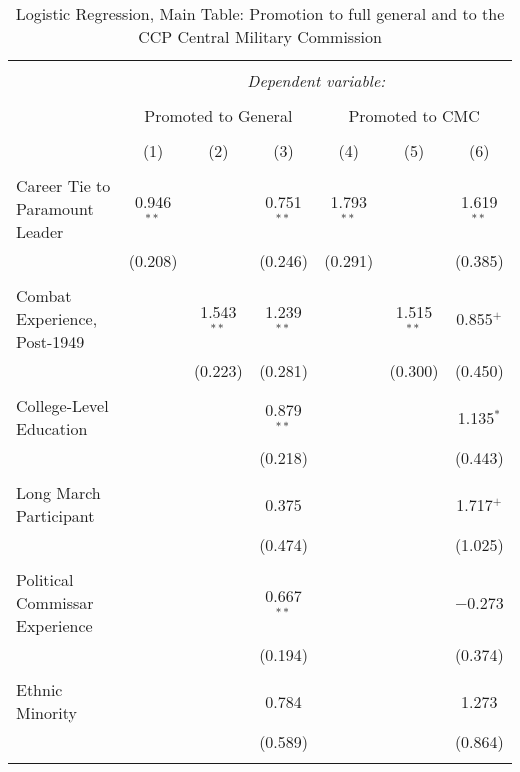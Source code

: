 \documentclass[12pt,letterpaper]{article}
\begin{document}
\begin{table}[!htbp] \centering 
	\caption{Logistic Regression, Main Table: Promotion to full general and to the CCP Central Military Commission} 
	\label{table_a8} 
	\begin{tabular}{@{\extracolsep{5pt}}lcccccc} 
		\\[-1.8ex]\hline 
		\hline \\[-1.8ex] 
		& \multicolumn{6}{c}{\textit{Dependent variable:}} \\ 
		\cline{2-7} 
		\\[-1.8ex] & \multicolumn{3}{c}{Promoted to General} & \multicolumn{3}{c}{Promoted to CMC} \\ 
		\\[-1.8ex] & (1) & (2) & (3) & (4) & (5) & (6)\\ 
		\hline \\[-1.8ex] 
		Career Tie to Paramount Leader & 0.946$^{**}$ &  & 0.751$^{**}$ & 1.793$^{**}$ &  & 1.619$^{**}$ \\ 
		& (0.208) &  & (0.246) & (0.291) &  & (0.385) \\ 
		& & & & & & \\ 
		Combat Experience, Post-1949 &  & 1.543$^{**}$ & 1.239$^{**}$ &  & 1.515$^{**}$ & 0.855$^{+}$ \\ 
		&  & (0.223) & (0.281) &  & (0.300) & (0.450) \\ 
		& & & & & & \\ 
		College-Level Education &  &  & 0.879$^{**}$ &  &  & 1.135$^{*}$ \\ 
		&  &  & (0.218) &  &  & (0.443) \\ 
		& & & & & & \\ 
		Long March Participant &  &  & 0.375 &  &  & 1.717$^{+}$ \\ 
		&  &  & (0.474) &  &  & (1.025) \\ 
		& & & & & & \\ 
		Political Commissar Experience &  &  & 0.667$^{**}$ &  &  & $-$0.273 \\ 
		&  &  & (0.194) &  &  & (0.374) \\ 
		& & & & & & \\ 
		Ethnic Minority &  &  & 0.784 &  &  & 1.273 \\ 
		&  &  & (0.589) &  &  & (0.864) \\ 
		& & & & & & \\ 

\end{tabular}
\end{table}
\end{document}
